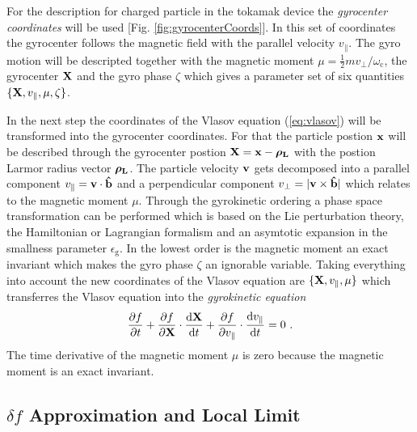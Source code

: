 For the description for charged particle in the tokamak device the \textit{gyrocenter coordinates} will be used [Fig. \ref{fig:gyrocenterCoords}]. In this set of coordinates the gyrocenter follows the magnetic field with the parallel velocity $v_{\parallel}$. The gyro motion will be descripted together with the magnetic moment $\mu = \frac{1}{2}mv_\perp/\omega_\mathrm{c}$, the gyrocenter $\boldsymbol{\mathbf{X}}$ and the gyro phase $\zeta$ which gives a parameter set of six quantities $\{\boldsymbol{\mathbf{X}}, v_{\parallel}, \mu, \zeta\}$.


In the next step the coordinates of the Vlasov equation (\ref{eq:vlasov}) will be transformed into the gyrocenter coordinates. For that the particle postion $\boldsymbol{\mathbf{x}}$ will be described through the gyrocenter postion $\boldsymbol{\mathbf{X}} = \boldsymbol{\mathbf{x}} - \boldsymbol{\mathbf{\rho_\mathrm{L}}}$ with the postion Larmor radius vector $\boldsymbol{\mathbf{\rho_\mathrm{L}}}$. The particle velocity $\boldsymbol{\mathbf{v}}$ gets decomposed into a parallel component $v_\parallel = \boldsymbol{\mathbf{v}} \cdot \boldsymbol{\mathbf{\hat{b}}}$ and 
a perpendicular component $v_\perp = |\boldsymbol{\mathbf{v}} \times \boldsymbol{\mathbf{\hat{b}}}|$ which relates to the magnetic moment $\mu$. Through the gyrokinetic ordering a phase space transformation can be performed which is based on the Lie perturbation theory, the Hamiltonian or Lagrangian formalism and an asymtotic expansion in the smallness parameter $\epsilon_\mathrm{g}$. In the lowest order is the magnetic moment an exact invariant which makes the gyro phase $\zeta$ an ignorable variable. \cite{Garbet2010,Cary1981,Cary1983} Taking everything into account the new coordinates of the Vlasov equation are $\{\boldsymbol{\mathbf{X}}, v_{\parallel}, \mu\}$ which transferres the Vlasov equation into the \textit{gyrokinetic equation}
\begin{gather}
	\frac{\partial f}{\partial t} + \frac{\partial f}{\partial \boldsymbol{\mathbf{X}}} \cdot \frac{\mathrm{d}\boldsymbol{\mathbf{X}}}{\mathrm{d}t} + \frac{\partial f}{\partial v_\parallel} \cdot \frac{\mathrm{d}v_\parallel}{\mathrm{d}t} = 0~.
	\label{eq:gyrokinetic}
\end{gather}
The time derivative of the magnetic moment $\mu$ is zero because the magnetic moment is an exact invariant. 

\subsection{$\delta f$ Approximation and Local Limit}
\label{sub:application}

